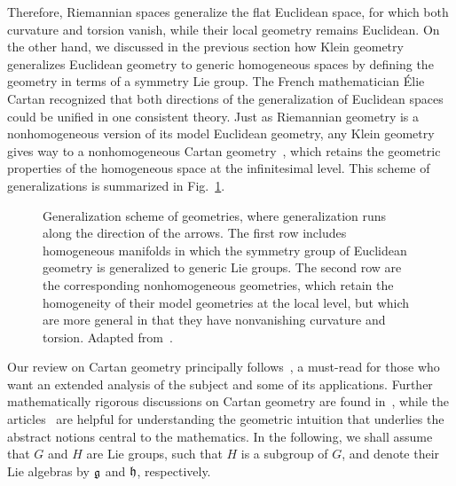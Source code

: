 \documentclass[
final,
11pt,
a4paper,
DIV=11,
headinclude=true,
footinclude=false,
bibliography=totoc,
twoside=true,  %
BCOR=5mm
]{scrbook}
\begin{document}
Therefore, Riemannian spaces generalize the flat Euclidean space, 
for which both curvature and torsion vanish, while their local 
geometry remains Euclidean. On the other hand, we discussed in 
the previous section how Klein geometry generalizes Euclidean 
geometry to generic homogeneous spaces by defining the geometry 
in terms of a symmetry Lie group. The French mathematician 
{\'E}lie Cartan recognized that both directions of the 
generalization of Euclidean spaces could be unified in one 
consistent theory. Just as Riemannian geometry is 
a nonhomogeneous version of its model Euclidean geometry, any 
Klein geometry gives way to a nonhomogeneous Cartan 
geometry~\cite{cartan:1923cc, Cartan:1926gh,cartan:1935rm}, which 
retains the geometric properties of the homogeneous space at the 
infinitesimal level.  This scheme of generalizations is 
summarized in Fig.~\ref{fig:gen_scheme_cartan}.

\begin{figure}
\centering
{}
\caption{%
  Generalization scheme of geometries, where generalization runs 
  along the direction of the arrows. The first row includes 
  homogeneous manifolds in which the symmetry group of Euclidean 
  geometry is generalized to generic Lie groups. The second row 
  are the corresponding nonhomogeneous geometries, which retain 
  the homogeneity of their model geometries at the local level, 
  but which are more general in that they have nonvanishing 
  curvature and torsion. Adapted from~\cite{sharpe1997diff_geo}.
}
\label{fig:gen_scheme_cartan}
\end{figure}

Our review on Cartan geometry principally 
follows~\cite{sharpe1997diff_geo}, a must-read for those who want 
an extended analysis of the subject and some of its applications.  
Further mathematically rigorous discussions on Cartan geometry 
are found in~\cite{kobayashi:1957tc, Alekseevsky:1995cc}, while 
the articles~\cite{Wise:2009fu, Wise:2010sm, Westman:2012xk} are 
helpful for understanding the geometric intuition that underlies 
the abstract notions central to the mathematics. In the 
following, we shall assume that $G$ and $H$ are Lie groups, such 
that $H$ is a subgroup of $G$, and denote their Lie algebras by 
$\mathfrak{g}$ and $\mathfrak{h}$, respectively.
\end{document}
